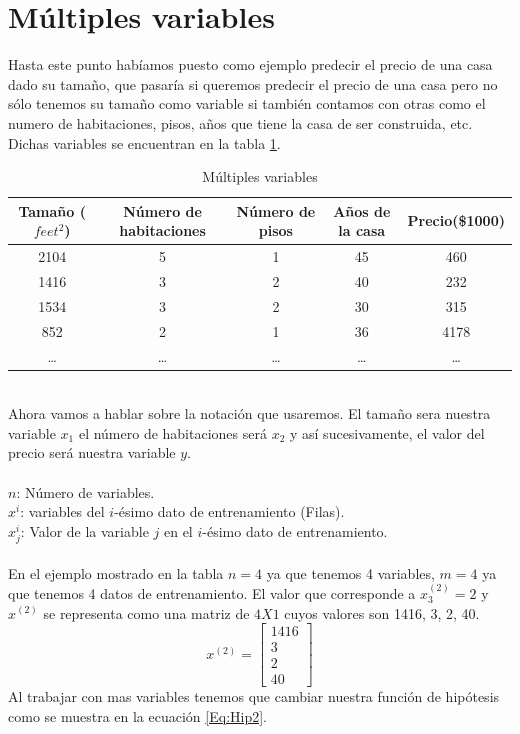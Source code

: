 \documentclass{report}
\begin{document}
\section{Múltiples variables}
Hasta este punto habíamos puesto como ejemplo predecir el precio de una casa dado su tamaño, que pasaría si queremos predecir el precio de una casa pero no sólo tenemos su tamaño como variable si también contamos con otras como el numero de habitaciones, pisos, años que tiene la casa de ser construida, etc. Dichas variables se encuentran en la tabla \ref{Tab:Multi}.
\begin{table}[h]
		\begin{tabular}{|c|c|c|c||c|}
			\hline
			Tamaño ($feet^2$) & Número de habitaciones & Número de pisos&Años de la casa&Precio(\$1000)\\
			\hline
			\hline
			2104&5&1&45&460\\
			1416&3&2&40&232\\
			1534&3&2&30&315\\
			852&2&1&36&4178\\
			\dots&\dots&\dots&\dots&\dots\\		
			\hline	
		\end{tabular}
	\caption{Múltiples variables}
	\label{Tab:Multi}
\end{table}
\\Ahora vamos a hablar sobre la notación que usaremos. El tamaño sera nuestra variable $x_1$ el número de habitaciones será $x_2$ y así sucesivamente, el valor del precio será nuestra variable $y$.\\\\
\textbf{\textit{$n$}}: Número de variables.\\
\textbf{\textit{$x^{i}$}}: variables del $i$-ésimo dato de entrenamiento (Filas).\\
\textbf{\textit{$x^{i}_j$}}: Valor de la variable $j$ en el $i$-ésimo dato de entrenamiento.\\\\
En el ejemplo mostrado en la tabla $n=4$ ya que tenemos 4 variables, $m=4$ ya que tenemos 4 datos de entrenamiento. El valor que corresponde a $ x_3^{(2)}=2$ y $x^{(2)}$ se representa como una matriz de $4X1$ cuyos valores son 1416, 3, 2, 40.
\[x^{(2)}=\left[
\begin{array}{c}
	1416\\3\\2\\40
\end{array}
\right]
\]
Al trabajar con mas variables tenemos que cambiar nuestra función de hipótesis como se muestra en la ecuación \ref{Eq:Hip2}.
\end{document}
